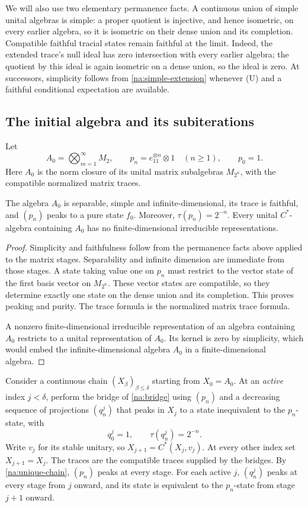 We will also use two elementary permanence facts. A continuous union
of simple unital algebras is simple: a proper quotient is injective,
and hence isometric, on every earlier algebra, so it is isometric on
their dense union and its completion. Compatible faithful tracial
states remain faithful at the limit. Indeed, the extended trace's
null ideal has zero intersection with every earlier algebra; the
quotient by this ideal is again isometric on a dense union, so the
ideal is zero. At successors, simplicity follows from
\cref{na:simple-extension} whenever \textup{(U)} and a faithful
conditional expectation are available.

\subsection{The initial algebra and its subiterations}

Let
\[
 A_0=\bigotimes_{m=1}^{\infty}M_2,\qquad
 p_n=e_{11}^{\otimes n}\otimes1\quad(n\ge1),\qquad p_0=1.
\]
Here $A_0$ is the norm closure of its unital matrix subalgebras
$M_{2^n}$, with the compatible normalized matrix traces.

\begin{lemma}\label{na:base-peak}
The algebra $A_0$ is separable, simple and infinite-dimensional, its
trace is faithful, and $(p_n)$ peaks to a pure state $f_0$.
Moreover, $\tau(p_n)=2^{-n}$. Every unital $C^*$-algebra containing $A_0$
has no finite-dimensional irreducible representations.
\end{lemma}
\begin{proof}
Simplicity and faithfulness follow from the permanence facts above
applied to the matrix stages. Separability and infinite dimension are
immediate from those stages. A state taking value one on $p_n$ must
restrict to the vector state of the first basis vector on $M_{2^n}$.
These vector states are compatible, so they determine exactly one
state on the dense union and its completion. This proves peaking and
purity. The trace formula is the normalized matrix trace formula.

A nonzero finite-dimensional irreducible representation of an
algebra containing $A_0$ restricts to a unital representation of
$A_0$. Its kernel is zero by simplicity, which would embed the
infinite-dimensional algebra $A_0$ in a finite-dimensional algebra.
\end{proof}

Consider a continuous chain $(X_\beta)_{\beta\le\delta}$ starting
from $X_0=A_0$. At an \emph{active} index $j<\delta$, perform the
bridge of \cref{na:bridge} using $(p_n)$ and a decreasing sequence
of projections $(q_n^j)$ that peaks in $X_j$ to a state inequivalent
to the $p_n$-state, with
\[
 q_0^j=1,\qquad \tau(q_n^j)=2^{-n}.
\]
Write $v_j$ for its stable unitary, so
$X_{j+1}=C^*(X_j,v_j)$. At every other index set $X_{j+1}=X_j$.
The traces are the compatible traces supplied by the bridges.
By \cref{na:unique-chain}, $(p_n)$ peaks at every stage. For each
active $j$, $(q_n^j)$ peaks at every stage from $j$ onward, and its
state is equivalent to the $p_n$-state from stage $j+1$ onward.

